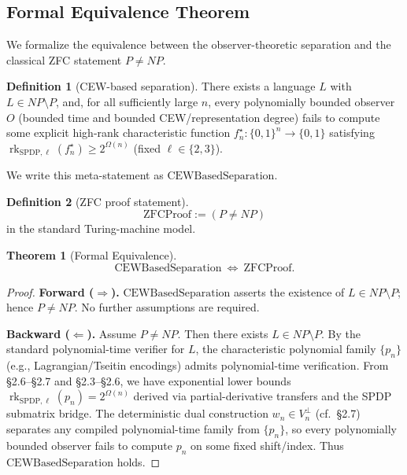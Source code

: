\documentclass[12pt]{article}
\newtheorem{theorem}{Theorem}
\theoremstyle{definition}
\newtheorem{definition}{Definition}
\theoremstyle{definition}
\theoremstyle{remark}
\theoremstyle{remark}
\begin{document}
\subsection{Formal Equivalence Theorem}

We formalize the equivalence between the observer-theoretic separation and the classical ZFC statement $P\neq NP$.

\begin{definition}[CEW-based separation]
There exists a language $L$ with $L\in NP\setminus P$, and, for all sufficiently large $n$, every polynomially bounded observer $O$ (bounded time and bounded CEW/representation degree) fails to compute some explicit high-rank characteristic function $f_n^\star:\{0,1\}^n\to\{0,1\}$ satisfying $\operatorname{rk}_{\mathrm{SPDP},\ell}(f_n^\star)\ge 2^{\Omega(n)}$ (fixed $\ell\in\{2,3\}$).

We write this meta-statement as $\mathrm{CEWBasedSeparation}$.
\end{definition}

\begin{definition}[ZFC proof statement]
\[
\mathrm{ZFCProof} := (P\neq NP)
\]
in the standard Turing-machine model.
\end{definition}

\begin{theorem}[Formal Equivalence]\label{thm:formal-equivalence}
\[
\mathrm{CEWBasedSeparation}\ \Longleftrightarrow\ \mathrm{ZFCProof}.
\]
\end{theorem}

\begin{proof}
\textbf{Forward ($\Rightarrow$).} $\mathrm{CEWBasedSeparation}$ asserts the existence of $L\in NP\setminus P$; hence $P\neq NP$. No further assumptions are required.

\textbf{Backward ($\Leftarrow$).} Assume $P\neq NP$. Then there exists $L\in NP\setminus P$. By the standard polynomial-time verifier for $L$, the characteristic polynomial family $\{p_n\}$ (e.g., Lagrangian/Tseitin encodings) admits polynomial-time verification. From \S2.6--\S2.7 and \S2.3--\S2.6, we have exponential lower bounds $\operatorname{rk}_{\mathrm{SPDP},\ell}(p_n)=2^{\Omega(n)}$ derived via partial-derivative transfers and the SPDP submatrix bridge. The deterministic dual construction $w_n\in V_n^{\perp}$ (cf.\ \S2.7) separates any compiled polynomial-time family from $\{p_n\}$, so every polynomially bounded observer fails to compute $p_n$ on some fixed shift/index. Thus $\mathrm{CEWBasedSeparation}$ holds.
\end{proof}
\end{document}
